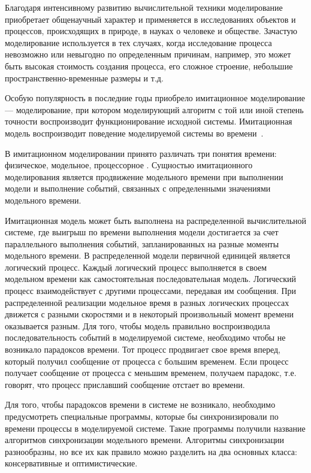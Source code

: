 
{\actuality} 
Благодаря интенсивному развитию вычислительной техники моделирование приобретает общенаучный характер и применяется в исследованиях объектов и процессов, происходящих в природе, в науках о человеке и обществе. Зачастую моделирование используется в тех случаях, когда исследование процесса невозможно или невыгодно по определенным причинам, например, это может быть высокая стоимость создания процесса, его сложное строение, небольшие пространственно-временные размеры и т.д.

Особую популярность в последние годы приобрело имитационное моделирование --- моделирование, при котором моделирующий алгоритм с той или иной степень точности воспроизводит функционирование исходной системы. Имитационная модель воспроизводит поведение моделируемой системы во времени~\cite{disksobmod}.

В имитационном моделировании принято различать три понятия времени: физическое, модельное, процессорное \cite{voz-disser}. Сущностью имитационного моделирования является продвижение модельного времени при выполнении модели и выполнение событий, связанных с определенными значениями модельного времени.

Имитационная модель может быть выполнена на распределенной вычислительной системе, где выигрыш по времени выполнения модели достигается за счет параллельного выполнения событий, запланированных на разные моменты модельного времени. В распределенной модели первичной единицей является логический процесс. Каждый логический процесс выполняется в своем модельном времени как самостоятельная последовательная модель. Логический процесс взаимодействует с другими процессами, передавая им сообщения. При распределенной реализации модельное время в разных логических процессах движется с разными скоростями и в некоторый произвольный момент времени оказывается разным. Для того, чтобы модель правильно воспроизводила последовательность событий в моделируемой системе, необходимо чтобы не возникало парадоксов времени. Тот процесс продвигает свое время вперед, который получил сообщение от процесса с большим временем. Если процесс получает сообщение от процесса с меньшим временем, получаем парадокс, т.е. говорят, что процесс приславший сообщение  отстает во времени.

Для того, чтобы парадоксов времени в системе не возникало, необходимо предусмотреть специальные программы, которые бы синхронизировали по времени процессы в моделируемой системе. Такие программы получили название алгоритмов синхронизации модельного времени. Алгоритмы синхронизации разнообразны, но все их как правило можно разделить на два основных класса: консервативные и оптимистические.

